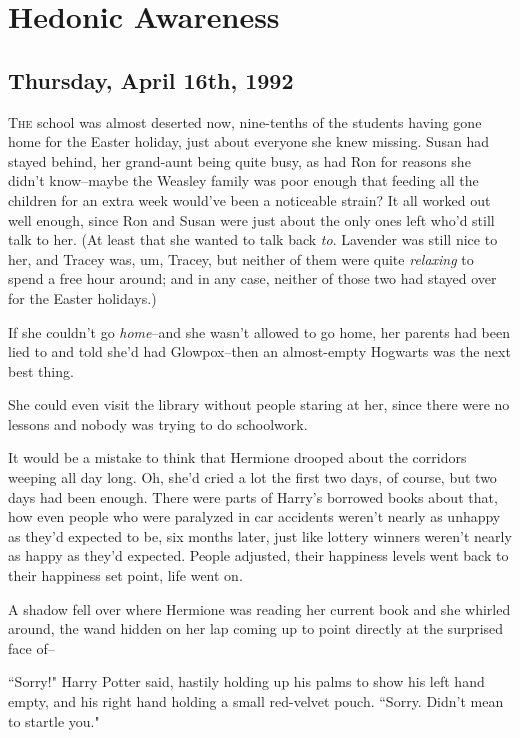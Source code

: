 \chapter{Hedonic Awareness}

\section{Thursday, April 16th, 1992}

\lettrine{T}{he} school was almost deserted now, nine-tenths of the students having gone home for the Easter holiday, just about everyone she knew missing. Susan had stayed behind, her grand-aunt being quite busy, as had Ron for reasons she didn't know\---maybe the Weasley family was poor enough that feeding all the children for an extra week would've been a noticeable strain? It all worked out well enough, since Ron and Susan were just about the only ones left who'd still talk to her. (At least that she wanted to talk back \emph{to}. Lavender was still nice to her, and Tracey was, um, Tracey, but neither of them were quite \emph{relaxing} to spend a free hour around; and in any case, neither of those two had stayed over for the Easter holidays.)

If she couldn't go \emph{home}\---and she wasn't allowed to go home, her parents had been lied to and told she'd had Glowpox\---then an almost-empty Hogwarts was the next best thing.

She could even visit the library without people staring at her, since there were no lessons and nobody was trying to do schoolwork.

It would be a mistake to think that Hermione drooped about the corridors weeping all day long. Oh, she'd cried a lot the first two days, of course, but two days had been enough. There were parts of Harry's borrowed books about that, how even people who were paralyzed in car accidents weren't nearly as unhappy as they'd expected to be, six months later, just like lottery winners weren't nearly as happy as they'd expected. People adjusted, their happiness levels went back to their happiness set point, life went on.

A shadow fell over where Hermione was reading her current book and she whirled around, the wand hidden on her lap coming up to point directly at the surprised face of\---

``Sorry!" Harry Potter said, hastily holding up his palms to show his left hand empty, and his right hand holding a small red-velvet pouch. ``Sorry. Didn't mean to startle you."

